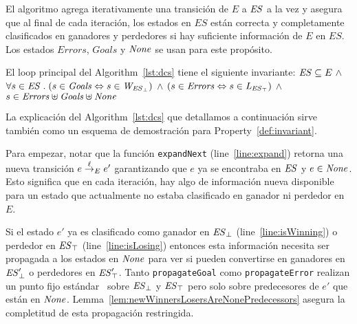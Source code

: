 El algoritmo agrega iterativamente una transición de $E$ a $\mathit{ES}$ a la vez y asegura que al final de cada iteración, los estados en $ES$ están correcta y completamente clasificados en ganadores y perdedores si hay suficiente información de $E$ en $ES$. Los estados $Errors$, 
$Goals$ y $\mathit{None}$ se usan para este propósito.

\begin{property}[Invariante]
\label{def:invariant}
El loop principal del Algorithm~\ref{lst:dcs} tiene el siguiente invariante: 
$\mathit{ES} \subseteq E \ \wedge $ $\forall s \in \mathit{ES} \;.\; (s\in\mathit{Goals} 
\Leftrightarrow 
s \in 
\mathit{W_{\mathit{\mathit{ES}_{\bot}}}})$ $\wedge$  $(s\in\mathit{Errors} 
\Leftrightarrow s \in \mathit{L_{\mathit{\mathit{ES}_{\top}}}})$ $\wedge$  
$s\in\mathit{Errors}\uplus\mathit{Goals}\uplus\mathit{None}$

\end{property}

La explicación del Algorithm~\ref{lst:dcs} que detallamos a continuación sirve también como un esquema de demostración para Property~\ref{def:invariant}.   

Para empezar, notar que la función \texttt{expandNext} 
(line~\ref{line:expand}) retorna una nueva transición $e \overset{\ell}{\rightarrow}_{E} e'$ 
garantizando que $e$ ya se encontraba en $\mathit{ES}$ y $e \in \mathit{None}$. 
Esto significa que en cada iteración, hay algo de información nueva disponible para un estado que actualmente no estaba clasificado en ganador ni perdedor en $E$.

Si el estado $e'$ ya es clasificado como ganador en
$\mathit{\mathit{ES}_{\bot}}$ (line~\ref{line:isWinning}) o
perdedor en $\mathit{\mathit{ES}_{\top}}$ (line~\ref{line:isLosing}) 
entonces esta información necesita ser propagada a los estados en $\mathit{None}$ para ver si pueden convertirse en ganadores en 
$\mathit{\mathit{ES}'_{\bot}}$ o perdedores en
$\mathit{\mathit{ES}'_{\top}}$. Tanto \texttt{propagateGoal} como
\texttt{propagateError} realizan un punto fijo estándar~\cite{Ramadge:1989:CDES} sobre
$\mathit{\mathit{ES}_{\bot}}$ y
$\mathit{\mathit{ES}_{\top}}$ pero solo sobre predecesores de $e'$ que están en $\mathit{None}$. 
Lemma~\ref{lem:newWinnersLosersAreNonePredecessors} asegura la completitud de esta propagación restringida.

